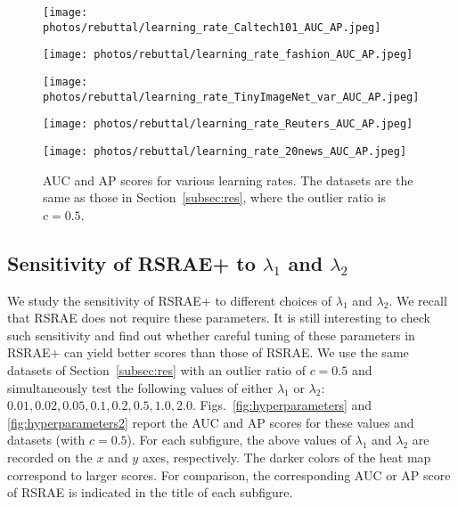 \documentclass{article} \usepackage{iclr2020_conference,times}
\def\Secref#1{Section~\ref{#1}}
\begin{document}
\begin{figure}[htbp]
\centering
\begin{minipage}[t]{0.48\textwidth}
\centering
\texttt{[image: photos/rebuttal/learning\_rate\_Caltech101\_AUC\_AP.jpeg]}
\end{minipage}
\begin{minipage}[t]{0.48\textwidth}
\centering
\texttt{[image: photos/rebuttal/learning\_rate\_fashion\_AUC\_AP.jpeg]}
\end{minipage}

\centering
\begin{minipage}[t]{0.48\textwidth}

\centering
\texttt{[image: photos/rebuttal/learning\_rate\_TinyImageNet\_var\_AUC\_AP.jpeg]}
\end{minipage}
\begin{minipage}[t]{0.48\textwidth}
\centering
\texttt{[image: photos/rebuttal/learning\_rate\_Reuters\_AUC\_AP.jpeg]}
\end{minipage}


 
\centering
\begin{minipage}[t]{0.48\textwidth}
\centering
\texttt{[image: photos/rebuttal/learning\_rate\_20news\_AUC\_AP.jpeg]}
\end{minipage}


\caption{AUC and AP scores for various learning rates.  The datasets are the same as those in \Secref{subsec:res}, where the outlier ratio is $c=0.5$.}
\label{fig:learningrate}

\end{figure}


\subsection{Sensitivity of RSRAE+ to $\lambda_1$ and $\lambda_2$}
\label{subsec:hyperparameters}


We study the sensitivity of RSRAE+ to different choices of $\lambda_1$ and $\lambda_2$. We recall that RSRAE does not require these parameters. It is still interesting to check such sensitivity and find out whether careful tuning of these parameters in RSRAE+ can yield better scores than those of RSRAE. We use the same datasets of \Secref{subsec:res} with an outlier ratio of $c=0.5$ and simultaneously test the following values of either $\lambda_1$ or  $\lambda_2$: $0.01, 0.02, 0.05, 0.1, 0.2, 0.5, 1.0, 2.0$. Figs.~\ref{fig:hyperparameters} and \ref{fig:hyperparameters2} report the AUC and AP scores for these values and datasets (with $c=0.5$). 
For each subfigure, the above values of $\lambda_1$ and $\lambda_2$ are recorded on the $x$ and $y$ axes, respectively. The darker colors of the heat map correspond to larger scores. For comparison, the corresponding AUC or AP score of RSRAE is indicated in the title of each subfigure. 
\end{document}
